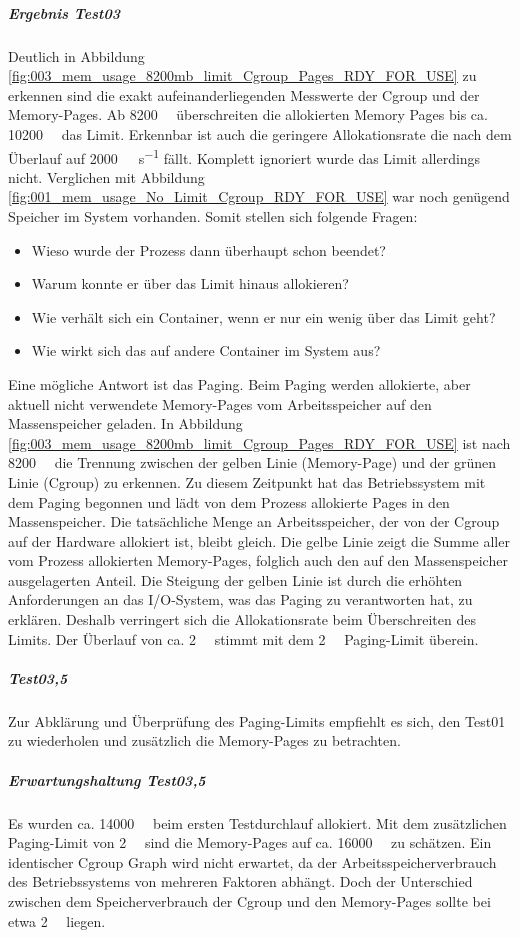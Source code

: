\subparagraph{Ergebnis Test03}
Deutlich in Abbildung \ref{fig:003_mem_usage_8200mb_limit_Cgroup_Pages_RDY_FOR_USE} zu erkennen sind die exakt aufeinanderliegenden Messwerte der Cgroup und der Memory-Pages. Ab \SI{8200}{\mega\byte} überschreiten die allokierten Memory Pages bis ca. \SI{10200}{\mega\byte} das Limit. Erkennbar ist auch die geringere Allokationsrate die nach dem Überlauf auf \SI{2000}{\mega\byte\per\second} fällt. Komplett ignoriert wurde das Limit allerdings nicht. Verglichen mit Abbildung \ref{fig:001_mem_usage_No_Limit_Cgroup_RDY_FOR_USE} war noch genügend Speicher im System vorhanden. Somit stellen sich folgende Fragen:

\begin{itemize}
    \item Wieso wurde der Prozess dann überhaupt schon beendet?
    \item Warum konnte er über das Limit hinaus allokieren? 
    \item Wie verhält sich ein Container, wenn er nur ein wenig über das Limit geht?
    \item Wie wirkt sich das auf andere Container im System aus?
\end{itemize}


Eine mögliche Antwort ist das Paging. Beim Paging werden allokierte, aber aktuell nicht verwendete Memory-Pages vom Arbeitsspeicher auf den Massenspeicher geladen. In Abbildung \ref{fig:003_mem_usage_8200mb_limit_Cgroup_Pages_RDY_FOR_USE} ist nach \SI{8200}{\mega\byte} die Trennung zwischen der gelben Linie (Memory-Page) und der grünen Linie (Cgroup) zu erkennen. Zu diesem Zeitpunkt hat das Betriebssystem mit dem Paging begonnen und lädt von dem Prozess allokierte Pages in den Massenspeicher. Die tatsächliche Menge an Arbeitsspeicher, der von der Cgroup auf der Hardware allokiert ist, bleibt gleich. Die gelbe Linie zeigt die Summe aller vom Prozess allokierten Memory-Pages, folglich auch den auf den Massenspeicher ausgelagerten Anteil. Die Steigung der gelben Linie ist durch die erhöhten Anforderungen an das I/O-System, was das Paging zu verantworten hat, zu erklären. Deshalb verringert sich die Allokationsrate beim Überschreiten des Limits. Der Überlauf von ca. \SI{2}{\giga\byte} stimmt mit dem \SI{2}{\giga\byte} Paging-Limit überein.

\subparagraph{Test03,5}
Zur Abklärung und Überprüfung des Paging-Limits empfiehlt es sich, den Test01  zu wiederholen und zusätzlich die Memory-Pages zu betrachten.

\subparagraph{Erwartungshaltung Test03,5}
Es wurden ca. \SI{14000}{\mega\byte} beim ersten Testdurchlauf allokiert. Mit dem zusätzlichen Paging-Limit von \SI{2}{\giga\byte} sind die Memory-Pages auf ca. \SI{16000}{\mega\byte} zu schätzen. Ein identischer Cgroup Graph wird nicht erwartet, da der Arbeitsspeicherverbrauch des Betriebssystems von mehreren Faktoren abhängt. Doch der Unterschied zwischen dem Speicherverbrauch der Cgroup und den Memory-Pages sollte bei etwa \SI{2}{\giga\byte} liegen. 

